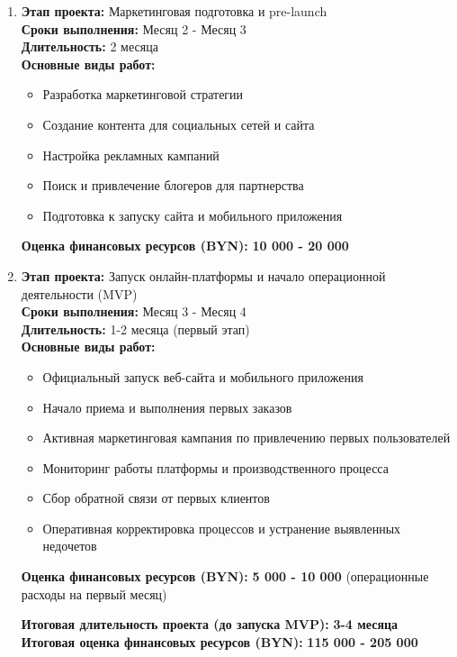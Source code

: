 \begin{enumerate}
    \item \textbf{Этап проекта:} Маркетинговая подготовка и pre-launch \\
        \textbf{Сроки выполнения:} Месяц 2 - Месяц 3 \\
        \textbf{Длительность:} 2 месяца \\
        \textbf{Основные виды работ:}
        \begin{itemize}
            \item Разработка маркетинговой стратегии
            \item Создание контента для социальных сетей и сайта
            \item Настройка рекламных кампаний
            \item Поиск и привлечение блогеров для партнерства
            \item Подготовка к запуску сайта и мобильного приложения
        \end{itemize}
        \textbf{Оценка финансовых ресурсов (BYN):} \textbf{10 000 - 20 000}
        \vspace{0.2cm}

    \item \textbf{Этап проекта:} Запуск онлайн-платформы и начало операционной деятельности (MVP) \\
        \textbf{Сроки выполнения:} Месяц 3 - Месяц 4 \\
        \textbf{Длительность:} 1-2 месяца (первый этап) \\
        \textbf{Основные виды работ:}
        \begin{itemize}
            \item Официальный запуск веб-сайта и мобильного приложения
            \item Начало приема и выполнения первых заказов
            \item Активная маркетинговая кампания по привлечению первых пользователей
            \item Мониторинг работы платформы и производственного процесса
            \item Сбор обратной связи от первых клиентов
            \item Оперативная корректировка процессов и устранение выявленных недочетов
        \end{itemize}
        \textbf{Оценка финансовых ресурсов (BYN):} \textbf{5 000 - 10 000} (операционные расходы на первый месяц)
        \vspace{0.2cm}

    \textbf{Итоговая длительность проекта (до запуска MVP):} \textbf{3-4 месяца} \\
    \textbf{Итоговая оценка финансовых ресурсов (BYN):} \textbf{115 000 - 205 000}
\end{enumerate}

